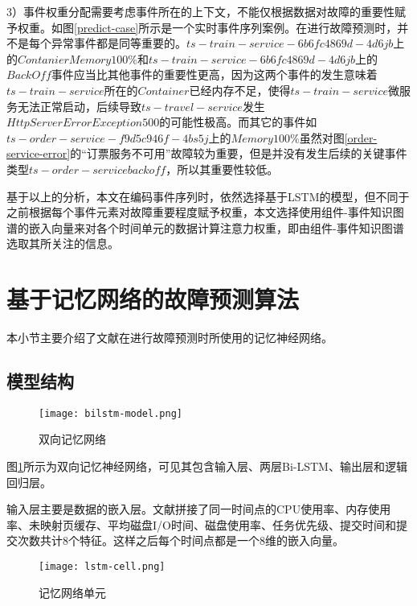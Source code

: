 3）事件权重分配需要考虑事件所在的上下文，不能仅根据数据对故障的重要性赋予权重。如图\ref{predict-case}所示是一个实时事件序列案例。在进行故障预测时，并不是每个异常事件都是同等重要的。$ts-train-service-6b6fc4869d-4d6jb$上的$Contanier Memory 100\%$和$ts-train-service-6b6fc4869d-4d6jb$上的$BackOff$事件应当比其他事件的重要性更高，因为这两个事件的发生意味着$ts-train-service$所在的$Container$已经内存不足，使得$ts-train-service$微服务无法正常启动，后续导致$ts-travel-service$发生$  HttpServerErrorException 500$的可能性极高。而其它的事件如$ts-order-service-f9d5c946f-4bs5j$上的$Memory 100\%$虽然对图\ref{order-service-error}的“订票服务不可用”故障较为重要，但是并没有发生后续的关键事件类型$ts-order-service backoff$，所以其重要性较低。

基于以上的分析，本文在编码事件序列时，依然选择基于LSTM的模型，但不同于之前根据每个事件元素对故障重要程度赋予权重\cite{gao2020task}，本文选择使用组件-事件知识图谱的嵌入向量来对各个时间单元的数据计算注意力权重，即由组件-事件知识图谱选取其所关注的信息。

\section{基于记忆网络的故障预测算法}\label{memory-net-section}
本小节主要介绍了文献\parencite{gao2020task}在进行故障预测时所使用的记忆神经网络。
\subsection{模型结构}
\begin{figure}[htbp]
    \centering
    \texttt{[image: bilstm-model.png]}
    \caption{双向记忆网络\label{bilstm-model}}
\end{figure}
图\ref{bilstm-model}所示为双向记忆神经网络，可见其包含输入层、两层Bi-LSTM、输出层和逻辑回归层。

输入层主要是数据的嵌入层。文献\parencite{gao2020task}拼接了同一时间点的CPU使用率、内存使用率、未映射页缓存、平均磁盘I/O时间、磁盘使用率、任务优先级、提交时间和提交次数共计8个特征。这样之后每个时间点都是一个8维的嵌入向量。
\begin{figure}[htbp]
    \centering
    \texttt{[image: lstm-cell.png]}
    \caption{记忆网络单元\label{lstm-cell}}
\end{figure}


